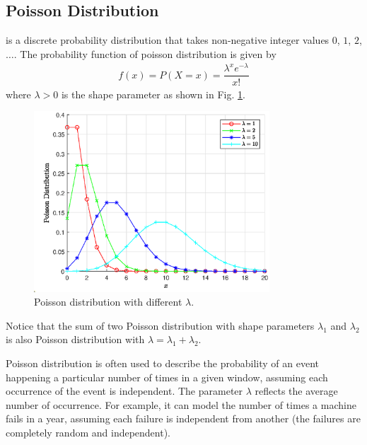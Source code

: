 \subsection{Poisson Distribution}

 is a discrete probability distribution that takes non-negative integer values $0$, $1$, $2$, $\ldots$. The probability function of poisson distribution is given by
\begin{eqnarray}
  f(x) = P(X=x) = \dfrac{\lambda^xe^{-\lambda}}{x!} \nonumber
\end{eqnarray}
where $\lambda >0$ is the shape parameter as shown in Fig. \ref{fig:poisson_pmf}.
\begin{figure}[!htb]
	\centering
	\includegraphics[width=250pt]{chapters/part-1/figures/poisson_pmf.eps}
	\caption{Poisson distribution with different $\lambda$.} \label{fig:poisson_pmf}
\end{figure}
Notice that the sum of two Poisson distribution with shape parameters $\lambda_1$ and $\lambda_2$ is also Poisson distribution with $\lambda = \lambda_1 + \lambda_2$.

Poisson distribution is often used to describe the probability of an event happening a particular number of times in a given window, assuming each occurrence of the event is independent. The parameter $\lambda$ reflects the average number of occurrence. For example, it can model the number of times a machine fails in a year, assuming each failure is independent from another (the failures are completely random and independent). 


